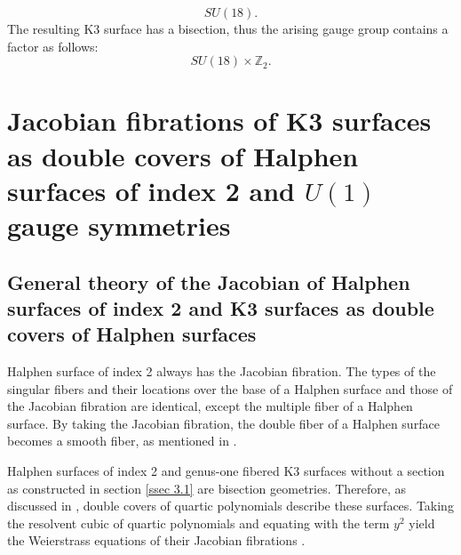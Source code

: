 \documentclass[12pt]{article}
\def\Z{\mathbb{Z}}
\begin{document}
\begin{equation}
SU(18).
\end{equation}
The resulting K3 surface has a bisection, thus the arising gauge group contains a factor as follows:
\begin{equation}
SU(18) \times \Z_2.
\end{equation}

\section{Jacobian fibrations of K3 surfaces as double covers of Halphen surfaces of index 2 and $U(1)$ gauge symmetries}
\label{sec 4}
\subsection{General theory of the Jacobian of Halphen surfaces of index 2 and K3 surfaces as double covers of Halphen surfaces}
\label{ssec 4.1}
Halphen surface of index 2 always has the Jacobian fibration. The types of the singular fibers and their locations over the base of a Halphen surface and those of the Jacobian fibration are identical, except the multiple fiber of a Halphen surface. By taking the Jacobian fibration, the double fiber of a Halphen surface becomes a smooth fiber, as mentioned in \cite{Kimura1801}.
\par Halphen surfaces of index 2 and genus-one fibered K3 surfaces without a section as constructed in section \ref{ssec 3.1} are bisection geometries. Therefore, as discussed in \cite{BM}, double covers of quartic polynomials describe these surfaces. Taking the resolvent cubic of quartic polynomials and equating with the term $y^2$ yield the Weierstrass equations of their Jacobian fibrations \cite{BM}.
\end{document}
